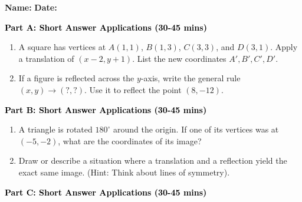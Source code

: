 \documentclass[12pt, letterpaper, fleqn]{article}
\begin{document}
\textbf{Name:} \underline{\hspace{5cm}}
\hfill
\textbf{Date:} \underline{\hspace{3cm}}\\


\begin{tcolorbox}[colback=customteal!20]
\large\textcolor{black}{\textbf{Part A: Short Answer Applications (30-45 mins)}}
\end{tcolorbox}

\vspace{3mm}

\begin{enumerate}[itemsep=4.2cm, leftmargin=0.6cm]
\item A square has vertices at $A(1, 1)$, $B(1, 3)$, $C(3, 3)$, and $D(3, 1)$. Apply a translation of $(x-2, y+1)$. List the new coordinates $A', B', C', D'$.
\item If a figure is reflected across the $y$-axis, write the general rule $(x, y) \rightarrow (?, ?)$. Use it to reflect the point $(8, -12)$.
\end{enumerate}

\newpage

\begin{tcolorbox}[colback=customteal!20]
\large\textcolor{black}{\textbf{Part B: Short Answer Applications (30-45 mins)}}
\end{tcolorbox}

\vspace{3mm}

\begin{enumerate}[itemsep=4.2cm, leftmargin=0.6cm, resume]
\item A triangle is rotated $180^\circ$ around the origin. If one of its vertices was at $(-5, -2)$, what are the coordinates of its image?
\item Draw or describe a situation where a translation and a reflection yield the exact same image. (Hint: Think about lines of symmetry).
\end{enumerate}

\newpage

\begin{tcolorbox}[colback=customteal!20]
\large\textcolor{black}{\textbf{Part C: Short Answer Applications (30-45 mins)}}
\end{tcolorbox}

\vspace{3mm}
\end{document}
